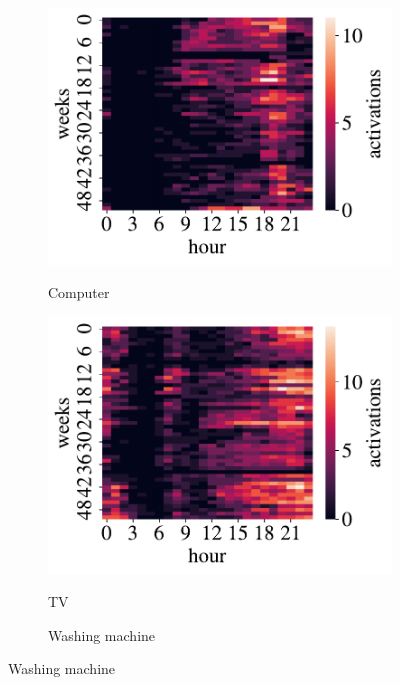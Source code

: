 \begin{figure}[H]
	\begin{subfigure}{.32\textwidth}
		\centering
		\caption{Computer}
		\includegraphics[width=1\textwidth]{../Figures/LPS/HM_Ywh_comp.pdf}
		\label{fig:HM_Ywh_comp}
	\end{subfigure}%
	\begin{subfigure}{.32\textwidth}
		\centering
		\caption{TV}
		\includegraphics[width=1\textwidth]{../Figures/LPS/HM_Ywh_tv.pdf}
		\label{fig:HM_Ywh_tv}
	\end{subfigure}%
	\begin{subfigure}{.32\textwidth}
		\centering
		\caption{Washing machine}

\end{subfigure}
\end{figure}

